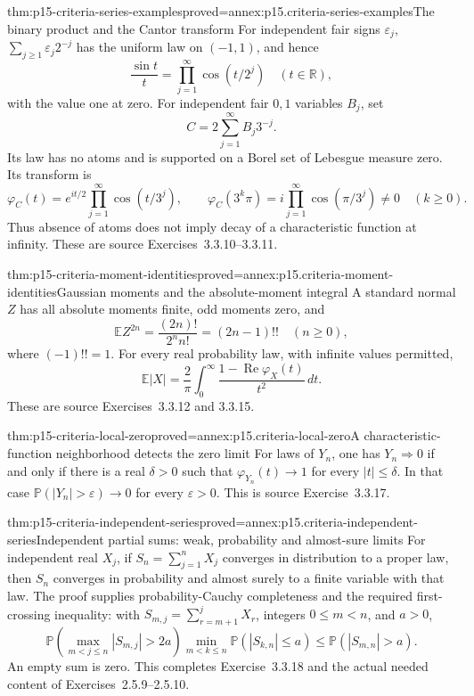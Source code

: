 \begin{hbtheorem}{thm:p15-criteria-series-examples}{proved=annex:p15.criteria-series-examples}{The binary product and the Cantor transform}
For independent fair signs \(\varepsilon_j\),
\(\sum_{j\geq1}\varepsilon_j2^{-j}\) has the uniform law on
\((-1,1)\), and hence
\[
 \frac{\sin t}{t}=\prod_{j=1}^\infty\cos(t/2^j)
                                      \quad(t\in\mathbb R),
\]
with the value one at zero.
For independent fair \(0,1\) variables \(B_j\), set
\[
 C=2\sum_{j=1}^\infty B_j3^{-j}.
\]
Its law has no atoms and is supported on a Borel set of
Lebesgue measure zero. Its transform is
\[
 \varphi_C(t)=e^{it/2}\prod_{j=1}^\infty\cos(t/3^j),
 \qquad
 \varphi_C(3^k\pi)=i\prod_{j=1}^\infty\cos(\pi/3^j)\ne0
                                     \quad(k\geq0).
\]
Thus absence of atoms does not imply decay of a characteristic
function at infinity. These are source Exercises~3.3.10--3.3.11.
\end{hbtheorem}

\begin{hbtheorem}{thm:p15-criteria-moment-identities}{proved=annex:p15.criteria-moment-identities}{Gaussian moments and the absolute-moment integral}
A standard normal \(Z\) has all absolute moments finite, odd
moments zero, and
\[
 \mathbb EZ^{2n}=\frac{(2n)!}{2^n n!}=(2n-1)!!
                                  \quad(n\geq0),
\]
where \((-1)!!=1\).
For every real probability law, with infinite values permitted,
\[
 \mathbb E|X|=\frac2\pi\int_0^\infty
                    \frac{1-\operatorname{Re}\varphi_X(t)}{t^2}\,dt.
\]
These are source Exercises~3.3.12 and 3.3.15.
\end{hbtheorem}

\begin{hbtheorem}{thm:p15-criteria-local-zero}{proved=annex:p15.criteria-local-zero}{A characteristic-function neighborhood detects the zero limit}
For laws of \(Y_n\), one has \(Y_n\Rightarrow0\) if and only if
there is a real \(\delta>0\) such that
\(\varphi_{Y_n}(t)\to1\) for every \(|t|\leq\delta\).
In that case \(\mathbb P(|Y_n|>\varepsilon)\to0\) for
every \(\varepsilon>0\).
This is source Exercise~3.3.17.
\end{hbtheorem}

\begin{hbtheorem}{thm:p15-criteria-independent-series}{proved=annex:p15.criteria-independent-series}{Independent partial sums: weak, probability and almost-sure limits}
For independent real \(X_j\), if
\(S_n=\sum_{j=1}^nX_j\) converges in distribution to a
proper law, then \(S_n\) converges in probability and
almost surely to a finite variable with that law.
The proof supplies probability-Cauchy completeness and
the required first-crossing inequality: with
\(S_{m,j}=\sum_{r=m+1}^jX_r\), integers \(0\leq m<n\),
and \(a>0\),
\[
 \mathbb P\!\left(\max_{m<j\leq n}|S_{m,j}|>2a\right)
 \min_{m<k\leq n}\mathbb P(|S_{k,n}|\leq a)
           \leq\mathbb P(|S_{m,n}|>a).
\]
An empty sum is zero. This completes Exercise~3.3.18
and the actual needed content of Exercises~2.5.9--2.5.10.
\end{hbtheorem}

